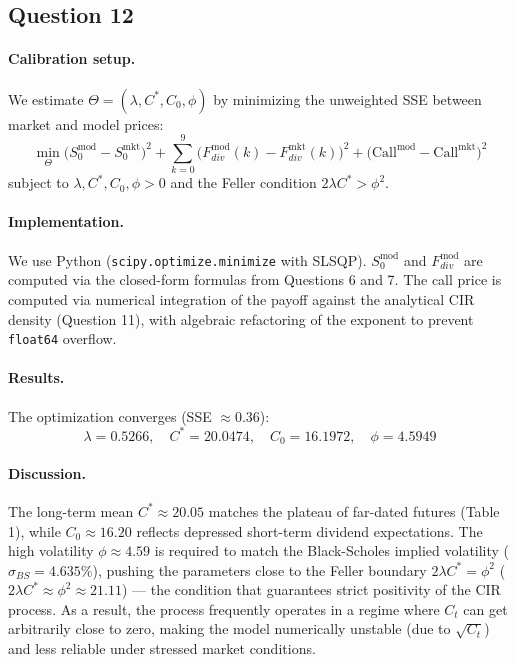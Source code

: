\documentclass[12pt,a4paper]{article}
\begin{document}
\subsection*{Question 12}

\paragraph{Calibration setup.} We estimate $\Theta = (\lambda, C^*, C_0, \phi)$ by minimizing the unweighted SSE between market and model prices:
\begin{equation*}
    \min_\Theta \big(S_0^{\mathrm{mod}} - S_0^{\mathrm{mkt}}\big)^2 + \sum_{k=0}^9 \big(F^{\mathrm{mod}}_{div}(k) - F^{\mathrm{mkt}}_{div}(k)\big)^2 + \big(\mathrm{Call}^{\mathrm{mod}} - \mathrm{Call}^{\mathrm{mkt}}\big)^2
\end{equation*}
subject to $\lambda, C^*, C_0, \phi > 0$ and the Feller condition $2\lambda C^* > \phi^2$.

\paragraph{Implementation.} We use Python (\texttt{scipy.optimize.minimize} with SLSQP). $S_0^{\mathrm{mod}}$ and $F^{\mathrm{mod}}_{div}$ are computed via the closed-form formulas from Questions 6 and 7. The call price is computed via numerical integration of the payoff against the analytical CIR density (Question 11), with algebraic refactoring of the exponent to prevent \texttt{float64} overflow.

\paragraph{Results.} The optimization converges (SSE $\approx 0.36$):
\begin{equation*}
    \lambda = 0.5266, \quad C^* = 20.0474, \quad C_0 = 16.1972, \quad \phi = 4.5949
\end{equation*}

\paragraph{Discussion.} The long-term mean $C^* \approx 20.05$ matches the plateau of far-dated futures (Table 1), while $C_0 \approx 16.20$ reflects depressed short-term dividend expectations. The high volatility $\phi \approx 4.59$ is required to match the Black-Scholes implied volatility ($\sigma_{BS} = 4.635\%$), pushing the parameters close to the Feller boundary $2\lambda C^* = \phi^2$ ($2\lambda C^* \approx \phi^2 \approx 21.11$) --- the condition that guarantees strict positivity of the CIR process. As a result, the process frequently operates in a regime where $C_t$ can get arbitrarily close to zero, making the model numerically unstable (due to $\sqrt{C_t}$) and less reliable under stressed market conditions.
\end{document}
